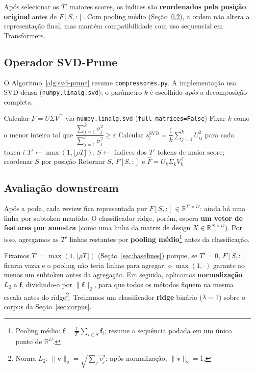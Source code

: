 Após selecionar os $T'$ maiores scores, os índices são \textbf{reordenados pela posição original} antes de $F[S,:]$. Com pooling médio (Seção~\ref{sec:protocolo-clf}), a ordem não altera a representação final, mas mantém compatibilidade com uso sequencial em Transformers.

\subsection{Operador SVD-Prune}\label{sec:operador}

O Algoritmo~\ref{alg:svd-prune} resume \texttt{compressores.py}. A implementação usa SVD densa (\texttt{numpy.linalg.svd}); o parâmetro $k$ é escolhido \emph{após} a decomposição completa.

\begin{algorithm}[ht]
    \caption{SVD truncada com leverage scores (\texttt{comprimir\_svd})}
    \label{alg:svd-prune}
    \begin{algorithmic}[1]
        \State Calcular $F = U \Sigma V^\top$ via \texttt{numpy.linalg.svd} (\texttt{full\_matrices=False})
        \State Fixar $k$ como o menor inteiro tal que $\dfrac{\sum_{j=1}^{k}\sigma_j^2}{\sum_{j=1}^{r}\sigma_j^2} \geq \varepsilon$
        \State Calcular $s_i^{\mathrm{SVD}} = \dfrac{1}{k}\sum_{j=1}^{k} U_{ij}^2$ para cada token $i$
        \State $T' \gets \max(1, \lfloor \rho T \rfloor)$; $S \gets$ índices dos $T'$ tokens de maior score; reordenar $S$ por posição
        \State Retornar $S$, $F[S,:]$ e $\hat{F} = U_k \Sigma_k V_k^\top$
    \end{algorithmic}
\end{algorithm}

\subsection{Avaliação downstream}\label{sec:protocolo-clf}

Após a poda, cada review fica representada por $F[S,:] \in \mathbb{R}^{T' \times D}$: ainda há uma linha por subtoken mantido. O classificador ridge, porém, espera \textbf{um vetor de features por amostra} (como uma linha da matriz de design $X \in \mathbb{R}^{N \times D}$). Por isso, agregamos as $T'$ linhas restantes por \textbf{pooling médio}\footnote{Pooling médio: $\bar{\mathbf{f}} = \frac{1}{T'}\sum_{i \in S} \mathbf{f}_i$; resume a sequência podada em um único ponto de $\mathbb{R}^D$.} antes da classificação.

Fixamos $T' = \max(1, \lfloor \rho T \rfloor)$ (Seção~\ref{sec:baselines}) porque, se $T'=0$, $F[S,:]$ ficaria vazia e o pooling não teria linhas para agregar; o $\max(1,\cdot)$ garante ao menos um subtoken antes da agregação. Em seguida, aplicamos \textbf{normalização $L_2$} a $\bar{\mathbf{f}}$, dividindo-o por $\|\bar{\mathbf{f}}\|_2$, para que todos os métodos fiquem na mesma escala antes do ridge\footnote{Norma $L_2$: $\|\mathbf{v}\|_2 = \sqrt{\sum_j v_j^2}$; após normalização, $\|\mathbf{v}\|_2=1$.}. Treinamos um classificador \textbf{ridge} binário ($\lambda = 1$) sobre o corpus da Seção~\ref{sec:corpus}.

